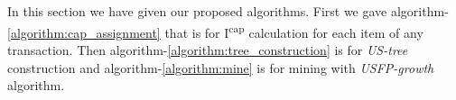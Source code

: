%
\subsection*{}
In this section we have given our proposed algorithms. First we gave algorithm-\ref{algorithm:cap_assignment} that is for I\textsuperscript{cap} calculation for each item of any transaction. Then algorithm-\ref{algorithm:tree_construction} is for \emph{US-tree} construction and algorithm-\ref{algorithm:mine} is for mining with \emph{USFP-growth} algorithm.
\subsection*{}

\newpage
\subsection*{}

\newpage
\subsection*{}

%